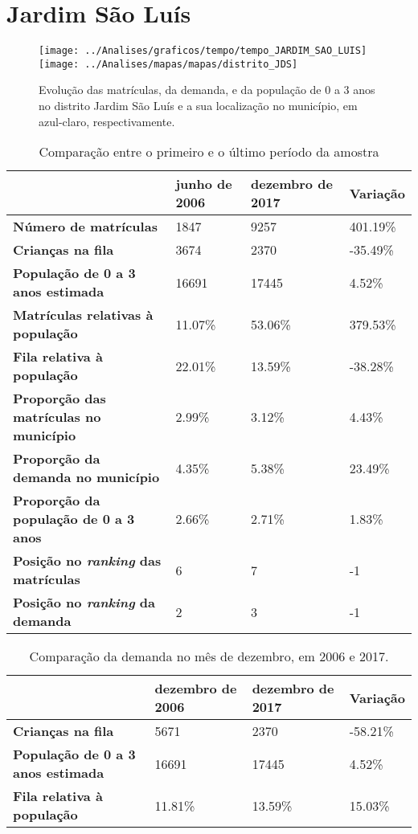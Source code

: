 \section{Jardim São Luís}
\begin{figure}[H]
\centering
\texttt{[image: ../Analises/graficos/tempo/tempo\_JARDIM\_SAO\_LUIS]}
\texttt{[image: ../Analises/mapas/mapas/distrito\_JDS]}
\caption{Evolução das matrículas, da demanda, e da população de 0 a 3 anos no distrito Jardim São Luís e a sua localização no município, em azul-claro, respectivamente.}
\end{figure}
\begin{table}[H]
\begin{tabular}{l|l|l|l}
\textbf{}                                      & \textbf{junho de 2006}       & \textbf{dezembro de 2017}    & \textbf{Variação} \\ \hline
\textbf{Número de matrículas}                  & 1847 & 9257 & 401.19\% \\ \hline
\textbf{Crianças na fila}                      & 3674 & 2370 & -35.49\% \\ \hline
\textbf{População de 0 a 3 anos estimada}      & 16691 & 17445 & 4.52\% \\ \hline
\textbf{Matrículas relativas à população}      & 11.07\% & 53.06\% & 379.53\% \\ \hline
\textbf{Fila relativa à população}             & 22.01\% & 13.59\% & -38.28\% \\ \hline
\textbf{Proporção das matrículas no município} & 2.99\% & 3.12\% & 4.43\% \\ \hline
\textbf{Proporção da demanda no município}     & 4.35\% & 5.38\% & 23.49\% \\ \hline
\textbf{Proporção da população de 0 a 3 anos}  & 2.66\% & 2.71\% & 1.83\% \\ \hline
\textbf{Posição no \textit{ranking} das matrículas}     & 6 & 7 & -1 \\ \hline
\textbf{Posição no \textit{ranking} da demanda}         & 2 & 3 & -1 \\ 
\end{tabular}
\caption{Comparação entre o primeiro e o último período da amostra}
\end{table}
\begin{table}[H]
\begin{tabular}{l|l|l|l}
\textbf{}                                 & \textbf{dezembro de 2006} & \textbf{dezembro de 2017} & \textbf{Variação} \\ \hline
\textbf{Crianças na fila}                      & 5671 & 2370 & -58.21\% \\ \hline
\textbf{População de 0 a 3 anos estimada}      & 16691 & 17445 & 4.52\% \\ \hline
\textbf{Fila relativa à população}             & 11.81\% & 13.59\% & 15.03\% \\
\end{tabular}
\caption{Comparação da demanda no mês de dezembro, em 2006 e 2017.}
\end{table}
